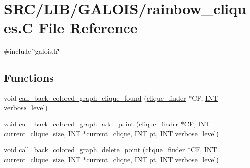 \hypertarget{rainbow__cliques_8_c}{}\section{S\+R\+C/\+L\+I\+B/\+G\+A\+L\+O\+I\+S/rainbow\+\_\+cliques.C File Reference}
\label{rainbow__cliques_8_c}
{\ttfamily \#include \char`\"{}galois.\+h\char`\"{}}\newline
\subsection*{Functions}
\begin{DoxyCompactItemize}
\item 
void \mbox{\hyperlink{rainbow__cliques_8_c_a89374a6e88e7da1264c7e1b594ec3559}{call\+\_\+back\+\_\+colored\+\_\+graph\+\_\+clique\+\_\+found}} (\mbox{\hyperlink{classclique__finder}{clique\+\_\+finder}} $\ast$CF, \mbox{\hyperlink{galois_8h_a09fddde158a3a20bd2dcadb609de11dc}{I\+NT}} \mbox{\hyperlink{simeon_8_c_a818073fbcc2f439e7c56952f67386122}{verbose\+\_\+level}})
\item 
void \mbox{\hyperlink{rainbow__cliques_8_c_adbbbaff1d90e06bf0b1b59cd1b0a596e}{call\+\_\+back\+\_\+colored\+\_\+graph\+\_\+add\+\_\+point}} (\mbox{\hyperlink{classclique__finder}{clique\+\_\+finder}} $\ast$CF, \mbox{\hyperlink{galois_8h_a09fddde158a3a20bd2dcadb609de11dc}{I\+NT}} current\+\_\+clique\+\_\+size, \mbox{\hyperlink{galois_8h_a09fddde158a3a20bd2dcadb609de11dc}{I\+NT}} $\ast$current\+\_\+clique, \mbox{\hyperlink{galois_8h_a09fddde158a3a20bd2dcadb609de11dc}{I\+NT}} \mbox{\hyperlink{clique__finder_8_c_aec1f1a2b30fdca8844c2932384483145}{pt}}, \mbox{\hyperlink{galois_8h_a09fddde158a3a20bd2dcadb609de11dc}{I\+NT}} \mbox{\hyperlink{simeon_8_c_a818073fbcc2f439e7c56952f67386122}{verbose\+\_\+level}})
\item 
void \mbox{\hyperlink{rainbow__cliques_8_c_ac29d571afa3e2eeb6e05793570c59f9c}{call\+\_\+back\+\_\+colored\+\_\+graph\+\_\+delete\+\_\+point}} (\mbox{\hyperlink{classclique__finder}{clique\+\_\+finder}} $\ast$CF, \mbox{\hyperlink{galois_8h_a09fddde158a3a20bd2dcadb609de11dc}{I\+NT}} current\+\_\+clique\+\_\+size, \mbox{\hyperlink{galois_8h_a09fddde158a3a20bd2dcadb609de11dc}{I\+NT}} $\ast$current\+\_\+clique, \mbox{\hyperlink{galois_8h_a09fddde158a3a20bd2dcadb609de11dc}{I\+NT}} \mbox{\hyperlink{clique__finder_8_c_aec1f1a2b30fdca8844c2932384483145}{pt}}, \mbox{\hyperlink{galois_8h_a09fddde158a3a20bd2dcadb609de11dc}{I\+NT}} \mbox{\hyperlink{simeon_8_c_a818073fbcc2f439e7c56952f67386122}{verbose\+\_\+level}})

\end{DoxyCompactItemize}
